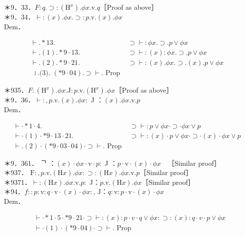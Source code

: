 \documentclass[10pt]{article}
\begin{document}
＊9．33．$F: q . \supset:\left(\mathrm{H}^{x}\right) . \phi x . \mathrm{v} . q$［Proof as above］\\
＊9．34．$\vdash:(x) . \phi x . \supset: p . \mathrm{v} .(x) . \phi x$\\
Dem．

\[
\begin{array}{ll}
\vdash . * 13 . & \supset \vdash: \phi x . \supset . p \vee \phi x \\
\vdash .(1) . * 9 \cdot 13 . & \supset \vdash:(x): \phi x . \supset . p \vee \phi x \\
\vdash .(2) . * 9 \cdot 21 . & \supset \vdash:(x) . \phi x . \supset .(x) . p \vee \phi x  \tag{3}\\
\text { ।.(3). }(* 9 \cdot 04) . \supset \vdash . \text { Prop }
\end{array}
\]

＊935．$F:\left(\mathrm{H}^{x}\right) . \phi x . \mathrm{J}: p . \mathrm{v} .\left(\mathrm{H}^{x}\right) . \phi x$［Proof as above］\\
＊9．36．$\vdash:, p . \mathrm{v} .(x) . \phi x:$ J ：$(x) . \phi x . \mathrm{v} . p$\\
Dem．

\[
\begin{array}{ll}
\vdash \cdot * 1 \cdot 4 . & \supset \vdash: p \vee \phi x \cdot \supset \cdot \phi x \vee p \\
\vdash \cdot(1) \cdot * 9 \cdot 13 \cdot 21 . & \supset \vdash:(x) \cdot p \vee \phi x \cdot \supset \cdot(x) \cdot \phi x \vee p  \tag{2}\\
\vdash .(2) \cdot(* 9 \cdot 03 \cdot 04) \cdot \supset \vdash . \text { Prop }
\end{array}
\]

＊9．361． ᄀ ：$(x) \cdot \phi x \cdot \mathrm{v} \cdot p:$ J ：$p \cdot \mathrm{v} \cdot(x) \cdot \phi x \quad$［Similar proof］\\
＊937． $\mathrm{F}:, p . \mathrm{v} .(\mathrm{H} x) . \phi x: \supset:(\mathrm{H} x) . \phi x . \mathrm{v} . p$［Similar proof］\\
＊9371．$\vdash:(\mathrm{H} x) . \phi x . \mathrm{v} . p:$ J：$p . \mathrm{v} .(\mathrm{H} x) . \phi x$［Similar proof］\\
＊94．$f:: p: \mathrm{v}: q \cdot \mathrm{v} \cdot(x) \cdot \phi x:$, J：$q: \mathrm{v}: p \cdot \mathrm{v} \cdot(x) \cdot \phi x$\\
Dem．


\begin{align*}
& \vdash \cdot * 1 \cdot 5 \cdot * 9 \cdot 21 \cdot \supset \vdash:(x): p \cdot v \cdot q \vee \phi x: \supset:(x): q \cdot v \cdot p \vee \phi x  \tag{1}\\
& \vdash \cdot(1) \cdot(* 9 \cdot 04) \cdot \supset \vdash \text {. Prop }
\end{align*}
\end{document}
